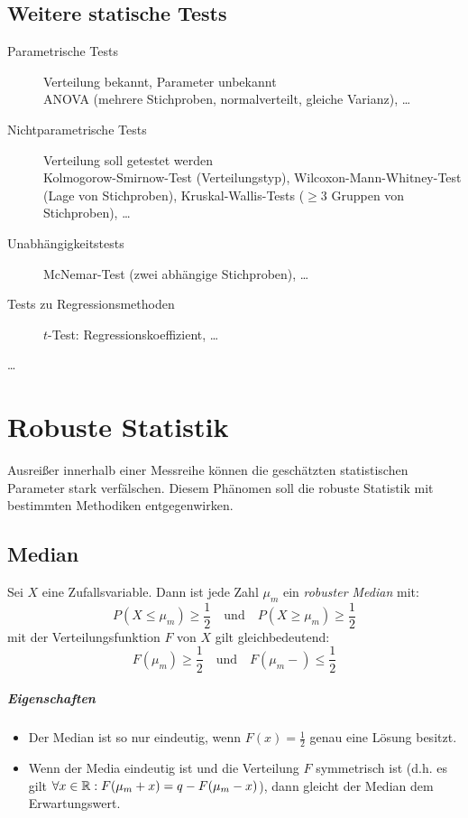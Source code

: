     \section{Weitere statische Tests}
        \begin{description}
        	\item[Parametrische Tests] Verteilung bekannt, Parameter unbekannt \\ ANOVA (mehrere Stichproben, normalverteilt, gleiche Varianz), \dots
        	\item[Nichtparametrische Tests] Verteilung soll getestet werden \\ Kolmogorow-Smirnow-Test (Verteilungstyp), Wilcoxon-Mann-Whitney-Test (Lage von Stichproben), Kruskal-Wallis-Tests (\(\geq 3\) Gruppen von Stichproben), \dots
        	\item[Unabhängigkeitstests] McNemar-Test (zwei abhängige Stichproben), \dots
        	\item[Tests zu Regressionsmethoden] \(t\)-Test: Regressionskoeffizient, \dots
        	\item[\dots]
        \end{description}

\chapter{Robuste Statistik}
    Ausreißer innerhalb einer Messreihe können die geschätzten statistischen Parameter stark verfälschen. Diesem Phänomen soll die robuste Statistik mit bestimmten Methodiken entgegenwirken.

    \section{Median}
        Sei \(X\) eine Zufallsvariable. Dann ist jede Zahl \( \mu_m \) ein \textit{robuster Median} mit:
        \begin{equation*}
            P(X \leq \mu_m) \geq \frac{1}{2} \quad \textrm{und} \quad P(X \geq \mu_m) \geq \frac{1}{2}
        \end{equation*}
        mit der Verteilungsfunktion \(F\) von \(X\) gilt gleichbedeutend:
        \begin{equation*}
            F(\mu_m) \geq \frac{1}{2} \quad \textrm{und} \quad F(\mu_m-) \leq \frac{1}{2}
        \end{equation*}
        
        \paragraph{Eigenschaften}
            \begin{itemize}
            	\item Der Median ist so nur eindeutig, wenn \( F(x) = \frac{1}{2} \) genau eine Lösung besitzt.
            	\item Wenn der Media eindeutig ist und die Verteilung \(F\) symmetrisch ist (d.h. es gilt \( \forall x \in \mathbb{R} : F(\mu_m + x) = q - F(\mu_m - x) \)), dann gleicht der Median dem Erwartungswert.
            \end{itemize}

